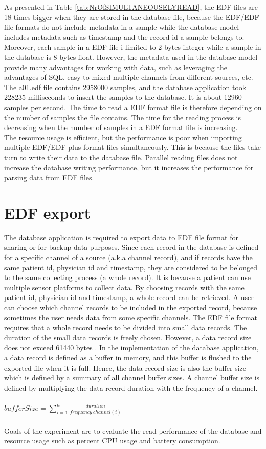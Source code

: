 As presented in Table \ref{tab:NrOfSIMULTANEOUSELYREAD}, the EDF files are 18 times bigger when they are stored in the database file, because the EDF/EDF file formats do not include metadata in a sample while the database model includes metadata such as timestamp and the record id a sample belongs to. Moreover, each sample in a EDF file i limited to 2 bytes integer while a sample in the database is 8 bytes float. However, the metadata used in the database model provide many advantages for working with data, such as leveraging the advantages of SQL, easy to mixed multiple channels from different sources, etc.\\
The a01.edf file contains 2958000 samples, and the database application took 228235 milliseconds to insert the samples to the database. It is about 12960 samples per second. The time to read a EDF format file is therefore depending on the number of samples the file contains. The time for the reading process is decreasing when the number of samples in a EDF format file is increasing.\\
The resource usage is efficient, but the performance is poor when importing multiple EDF/EDF plus format files simultaneously. This is because the files take turn to write their data to the database file. Parallel reading files does not increase the database writing performance, but it increases the performance for parsing data from EDF files.
\section{EDF export}
The database application is required to export data to EDF file format for sharing or for backup data purposes. Since each record in the database is defined for a specific channel of a source (a.k.a channel record), and if records have the same patient id, physician id and timestamp, they are considered to be belonged to the same collecting process (a whole record). It is because a patient can use multiple sensor platforms to collect data. By choosing records with the same patient id, physician id and timestamp, a whole record can be retrieved. A user can choose which channel records to be included in the exported record, because sometimes the user needs data from some specific channels. The EDF file format requires that a whole record needs to be divided into small data records. The duration of the small data records is freely chosen. However, a data record size does not exceed 61440 bytes \citep{EDFpluss}. In the implementation of the database application, a data record is defined as a buffer in memory, and this buffer is flushed to the exported file when it is full. Hence, the data record size is also the buffer size which is defined by a summary of all channel buffer sizes. A channel buffer size is defined by multiplying the data record duration with the frequency of a channel.\\\\
$bufferSize=\sum_{i = 1}^{n}\frac{duration}{frequency\ channel(i)}$\\\\
Goals of the experiment are to evaluate the read performance of the database and resource usage such as percent CPU usage and battery consumption.

